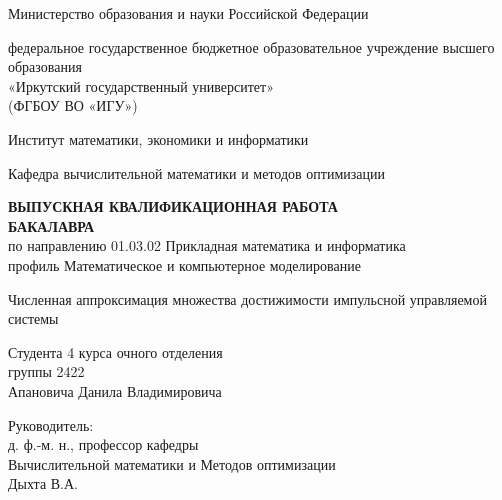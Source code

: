 \documentclass[a4paper,12pt]{article}
\begin{document}
\large
\begin{titlepage}
    \newpage
    \begin{singlespacing}
        \begin{center}
            Министерство образования и науки Российской Федерации

            федеральное государственное бюджетное образовательное учреждение
            высшего образования \\
            «Иркутский государственный университет» \\
            (ФГБОУ ВО «ИГУ»)

            Институт математики, экономики и информатики

            Кафедра вычислительной математики и методов оптимизации

            \vspace{5em}
            { \bf ВЫПУСКНАЯ КВАЛИФИКАЦИОННАЯ РАБОТА\\БАКАЛАВРА }
            \\[0.3cm]
            по направлению 01.03.02 Прикладная математика и информатика \\
            профиль Математическое и компьютерное моделирование

            \vspace{1em}

            { \Large Численная аппроксимация множества достижимости импульсной
            управляемой системы }
        \end{center}      
        \vspace{2em}

        \begin{flushright}
            {
                \parindent=0pt
                Студента 4 курса очного отделения\\
                группы 2422\\
                Апановича Данила Владимировича

                \vspace{1em}

                Руководитель:\\
                д. ф.-м. н., профессор кафедры\\ Вычислительной математики и Методов оптимизации \\ 
                \underline{\phantom{Четкая подпись}} Дыхта В.А. 

}
\end{flushright}
\end{singlespacing}
\end{titlepage}
\end{document}
